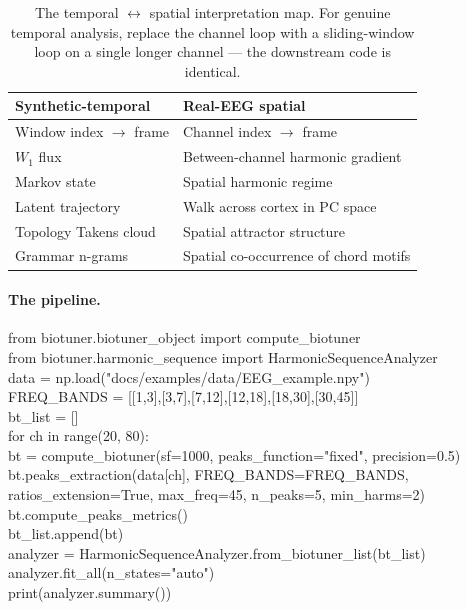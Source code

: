 \documentclass[11pt,a4paper]{article}
\begin{document}
\begin{table}[H]
\centering
\small
\begin{tabular}{@{}ll@{}}
\toprule
\textbf{Synthetic-temporal} & \textbf{Real-EEG spatial} \\
\midrule
Window index $\to$ frame & Channel index $\to$ frame \\
$W_1$ flux               & Between-channel harmonic gradient \\
Markov state             & Spatial harmonic regime \\
Latent trajectory        & Walk across cortex in PC space \\
Topology Takens cloud    & Spatial attractor structure \\
Grammar n-grams          & Spatial co-occurrence of chord motifs \\
\bottomrule
\end{tabular}
\caption{The temporal $\leftrightarrow$ spatial interpretation map. For
genuine temporal analysis, replace the channel loop with a
sliding-window loop on a single longer channel --- the downstream code
is identical.}
\end{table}

\paragraph{The pipeline.}

\begin{tcolorbox}[colback=black!4, colframe=black!30, sharp corners,
                  fontupper=\small\ttfamily, before skip=4pt, after skip=4pt]
from biotuner.biotuner\_object import compute\_biotuner\\
from biotuner.harmonic\_sequence import HarmonicSequenceAnalyzer\\[2pt]
data = np.load("docs/examples/data/EEG\_example.npy")\\
FREQ\_BANDS = [[1,3],[3,7],[7,12],[12,18],[18,30],[30,45]]\\
bt\_list = []\\
for ch in range(20, 80):\\
\hspace*{2em}bt = compute\_biotuner(sf=1000, peaks\_function="fixed", precision=0.5)\\
\hspace*{2em}bt.peaks\_extraction(data[ch], FREQ\_BANDS=FREQ\_BANDS,\\
\hspace*{6em}ratios\_extension=True, max\_freq=45, n\_peaks=5, min\_harms=2)\\
\hspace*{2em}bt.compute\_peaks\_metrics()\\
\hspace*{2em}bt\_list.append(bt)\\
analyzer = HarmonicSequenceAnalyzer.from\_biotuner\_list(bt\_list)\\
analyzer.fit\_all(n\_states="auto")\\
print(analyzer.summary())
\end{tcolorbox}
\end{document}
